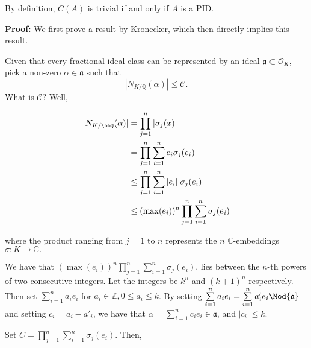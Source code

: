 \documentclass[a4paper, 12pt,oneside,openany]{book}
\begin{document}

By definition, $C(A)$ is trivial if and only if $A$ is a PID.


\textbf{Proof:} We first prove a result by Kronecker, which then directly implies this result. 


Given that every fractional ideal class can be represented by an ideal $\mathfrak{a} \subset \mathcal{O}_K$, pick a non-zero $\alpha \in \mathfrak{a}$ such that $$|N_{K/\mathbb{Q}}(\alpha)| \leq \mathcal{C}.$$ What is $\mathcal{C}?$ Well, 

\begin{align*}
    |N_{K/\bbQ}(\alpha)|&= \prod\limits_{j=1}^{n} |\sigma_j(x)|\\
    &= \prod\limits_{j=1}^n \sum\limits_{i=1}^{n} e_i \sigma_j(e_i) \\
    &\leq \prod\limits_{j=1}^n \sum\limits_{i=1}^{n} |e_i| |\sigma_j(e_i)| \\
    &\leq (\max(e_i))^n \prod\limits_{j=1}^{n} \sum\limits_{i=1}^{n} \sigma_j(e_i) \\
\end{align*}

where the product ranging from $j=1$ to $n$ represents the $n$ $\mathbb{C}$-embeddings $\sigma:K\to \mathbb{C}.$ 

We have that $(\max(e_i))^n \prod\limits_{j=1}^n \sum\limits_{i=1}^{n} \sigma_j(e_i).$ lies between the $n$-th powers of two consecutive integers. Let the integers be $k^n$ and $(k+1)^n$ respectively. Then set $\sum\limits_{i=1}^n a_ie_i$ for $a_i \in \mathbb{Z}, 0 \leq a_i \leq k$. By setting $\sum\limits_{i=1}^n a_ie_i=\sum\limits_{i=1}^n a'_ie_i\Mod{\mathfrak{a}}$ and setting $c_i = a_i-a'_i$, we have that $\alpha=\sum\limits_{i=1}^n c_ie_i \in \mathfrak{a}$, and $|c_i| \leq k.$ 

Set $C=\prod\limits_{j=1}^n \sum\limits_{i=1}^{n} \sigma_j(e_i).$ Then,
\end{document}
